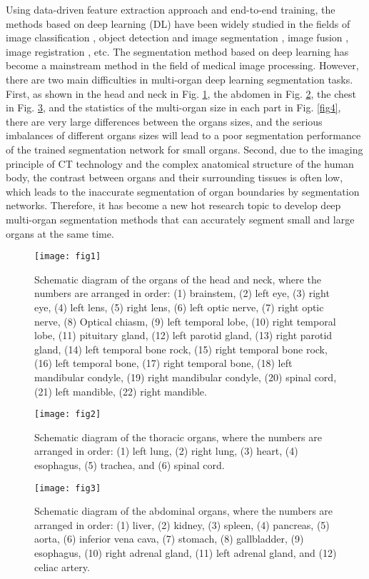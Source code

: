 \documentclass[lettersize,journal]{IEEEtran}
\begin{document}
Using data-driven feature extraction approach and end-to-end training, the methods based on deep learning (DL) have been widely studied in the fields of image classification \cite{21}, object detection \cite{22} and image segmentation \cite{23,24}, image fusion \cite{25}, image registration \cite{26}, etc. The segmentation method based on deep learning has become a mainstream method in the field of medical image processing. However, there are two main difficulties in multi-organ deep learning segmentation tasks. First, as shown in the head and neck in Fig. \ref{fig1}, the abdomen in Fig. \ref{fig2}, the chest in Fig. \ref{fig3}, and the statistics of the multi-organ size in each part in Fig. \ref{fig4}, there are very large differences between the organs sizes, and the serious imbalances of different organs sizes will lead to a poor segmentation performance of the trained segmentation network for small organs. Second, due to the imaging principle of CT technology and the complex anatomical structure of the human body, the contrast between organs and their surrounding tissues is often low, which leads to the inaccurate segmentation of organ boundaries by segmentation networks. Therefore, it has become a new hot research topic to develop deep multi-organ segmentation methods that can accurately segment small and large organs at the same time.
\begin{figure}[ht!]
    \centering
    \texttt{[image: fig1]}
    \caption{Schematic diagram of the organs of the head and neck, where the numbers are arranged in order: (1) brainstem, (2) left eye, (3) right eye, (4) left lens, (5) right lens, (6) left optic nerve, (7) right optic nerve, (8) Optical chiasm, (9) left temporal lobe, (10) right temporal lobe, (11) pituitary gland, (12) left parotid gland, (13) right parotid gland, (14) left temporal bone rock, (15) right temporal bone rock, (16) left temporal bone, (17) right temporal bone, (18) left mandibular condyle, (19) right mandibular condyle, (20) spinal cord, (21) left mandible, (22) right mandible.}
    \label{fig1}
\end{figure}
\begin{figure}[ht!]
    \centering
    \texttt{[image: fig2]}
    \caption{Schematic diagram of the thoracic organs, where the numbers are arranged in order: (1) left lung, (2) right lung, (3) heart, (4) esophagus, (5) trachea, and (6) spinal cord.}
    \label{fig2}
\end{figure}
\begin{figure}[ht!]
    \centering
    \texttt{[image: fig3]}
    \caption{Schematic diagram of the abdominal organs, where the numbers are arranged in order: (1) liver, (2) kidney, (3) spleen, (4) pancreas, (5) aorta, (6) inferior vena cava, (7) stomach, (8) gallbladder, (9) esophagus, (10) right adrenal gland, (11) left adrenal gland, and (12) celiac artery.}
    \label{fig3}
\end{figure}
\end{document}
